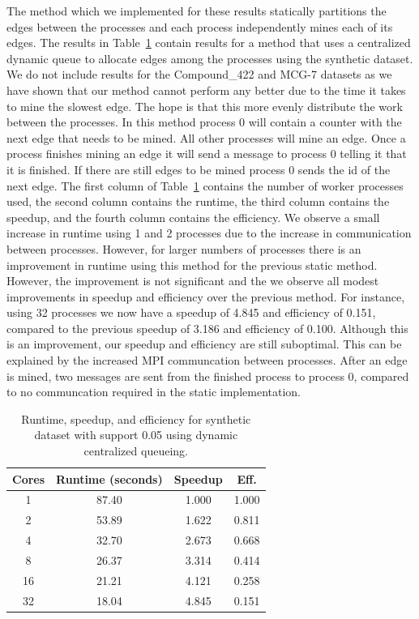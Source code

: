 The method which we implemented for these results statically partitions
the edges between the processes and each process independently mines each of
its edges. The results in Table~\ref{tab:synth_dyn} contain results for a
method that uses a centralized dynamic queue to allocate edges among the
processes using the synthetic dataset. We do not include results for the
Compound\_422 and MCG-7 datasets as we have shown that our method cannot
perform any better due to the time it takes to mine the slowest edge.
The hope is that this more evenly
distribute the work between the processes. In this method process 0 will
contain a counter with the next edge that needs to be mined. All other
processes will mine an edge. Once a process finishes mining an edge it will
send a message to process 0 telling it that it is finished. If there are still
edges to be mined process 0 sends the id of the next edge. The first column of
Table~\ref{tab:synth_dyn} contains the number of worker processes used, the
second column contains the runtime, the third column contains the speedup, and
the fourth column contains the efficiency.
We observe a small increase in runtime using 1 and 2 processes due to the
increase in communication between processes. However, for larger numbers of
processes there is an improvement in runtime using this method for the
previous static method. However, the improvement is not significant and the
we observe all modest improvements in speedup and efficiency over the previous
method. For instance, using 32 processes we now have a speedup of 4.845 and
efficiency of 0.151, compared to the previous speedup of 3.186 and efficiency
of 0.100. Although this is an improvement, our speedup and efficiency are still
suboptimal. This can be explained by the increased MPI communcation between
processes. After an edge is mined, two messages are sent from the finished process
to process 0, compared to no communcation required in the static implementation.


\begin{table}
\centering
\begin{tabular}{cccc}
\hline
Cores & Runtime (seconds) & Speedup &  Eff.  \\
\hline
1   &    87.40   &     1.000  &    1.000   \\ 
2   &    53.89   &     1.622  &    0.811   \\
4   &    32.70   &     2.673  &    0.668   \\
8   &    26.37   &     3.314  &    0.414   \\
16  &    21.21   &     4.121  &    0.258   \\
32  &    18.04   &     4.845  &    0.151   \\
\hline
\end{tabular}
\caption{Runtime, speedup, and efficiency for synthetic dataset with support
         0.05 using dynamic centralized queueing.}
\label{tab:synth_dyn}
\end{table}

